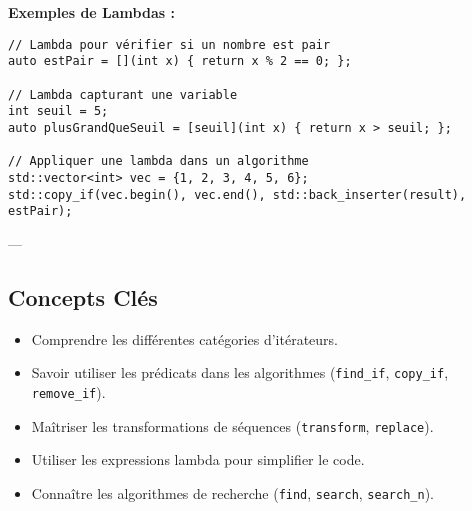 \textbf{Exemples de Lambdas :}
\begin{tcolorbox}[colframe=blue!50!black, colback=blue!5!white, title=Exemples de Lambdas]
\begin{verbatim}
// Lambda pour vérifier si un nombre est pair
auto estPair = [](int x) { return x % 2 == 0; };

// Lambda capturant une variable
int seuil = 5;
auto plusGrandQueSeuil = [seuil](int x) { return x > seuil; };

// Appliquer une lambda dans un algorithme
std::vector<int> vec = {1, 2, 3, 4, 5, 6};
std::copy_if(vec.begin(), vec.end(), std::back_inserter(result), estPair);
\end{verbatim}
\end{tcolorbox}

---

\subsection{ Concepts Clés}
\begin{itemize}
    \item Comprendre les différentes catégories d’itérateurs.
    \item Savoir utiliser les prédicats dans les algorithmes (\texttt{find\_if}, \texttt{copy\_if}, \texttt{remove\_if}).
    \item Maîtriser les transformations de séquences (\texttt{transform}, \texttt{replace}).
    \item Utiliser les expressions lambda pour simplifier le code.
    \item Connaître les algorithmes de recherche (\texttt{find}, \texttt{search}, \texttt{search\_n}).
\end{itemize}
